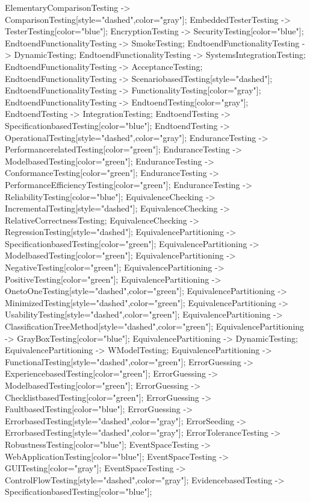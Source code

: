 \documentclass{article}
\begin{document}
{ElementaryComparisonTesting -> ComparisonTesting[style="dashed",color="gray"];
EmbeddedTesterTesting -> TesterTesting[color="blue"];
EncryptionTesting -> SecurityTesting[color="blue"];
EndtoendFunctionalityTesting -> SmokeTesting;
EndtoendFunctionalityTesting -> DynamicTesting;
EndtoendFunctionalityTesting -> SystemsIntegrationTesting;
EndtoendFunctionalityTesting -> AcceptanceTesting;
EndtoendFunctionalityTesting -> ScenariobasedTesting[style="dashed"];
EndtoendFunctionalityTesting -> FunctionalityTesting[color="gray"];
EndtoendFunctionalityTesting -> EndtoendTesting[color="gray"];
EndtoendTesting -> IntegrationTesting;
EndtoendTesting -> SpecificationbasedTesting[color="blue"];
EndtoendTesting -> OperationalTesting[style="dashed",color="gray"];
EnduranceTesting -> PerformancerelatedTesting[color="green"];
EnduranceTesting -> ModelbasedTesting[color="green"];
EnduranceTesting -> ConformanceTesting[color="green"];
EnduranceTesting -> PerformanceEfficiencyTesting[color="green"];
EnduranceTesting -> ReliabilityTesting[color="blue"];
EquivalenceChecking -> IncrementalTesting[style="dashed"];
EquivalenceChecking -> RelativeCorrectnessTesting;
EquivalenceChecking -> RegressionTesting[style="dashed"];
EquivalencePartitioning -> SpecificationbasedTesting[color="green"];
EquivalencePartitioning -> ModelbasedTesting[color="green"];
EquivalencePartitioning -> NegativeTesting[color="green"];
EquivalencePartitioning -> PositiveTesting[color="green"];
EquivalencePartitioning -> OnetoOneTesting[style="dashed",color="green"];
EquivalencePartitioning -> MinimizedTesting[style="dashed",color="green"];
EquivalencePartitioning -> UsabilityTesting[style="dashed",color="green"];
EquivalencePartitioning -> ClassificationTreeMethod[style="dashed",color="green"];
EquivalencePartitioning -> GrayBoxTesting[color="blue"];
EquivalencePartitioning -> DynamicTesting;
EquivalencePartitioning -> WModelTesting;
EquivalencePartitioning -> FunctionalTesting[style="dashed",color="green"];
ErrorGuessing -> ExperiencebasedTesting[color="green"];
ErrorGuessing -> ModelbasedTesting[color="green"];
ErrorGuessing -> ChecklistbasedTesting[color="green"];
ErrorGuessing -> FaultbasedTesting[color="blue"];
ErrorGuessing -> ErrorbasedTesting[style="dashed",color="gray"];
ErrorSeeding -> ErrorbasedTesting[style="dashed",color="gray"];
ErrorToleranceTesting -> RobustnessTesting[color="blue"];
EventSpaceTesting -> WebApplicationTesting[color="blue"];
EventSpaceTesting -> GUITesting[color="gray"];
EventSpaceTesting -> ControlFlowTesting[style="dashed",color="gray"];
EvidencebasedTesting -> SpecificationbasedTesting[color="blue"];
}
\end{document}
